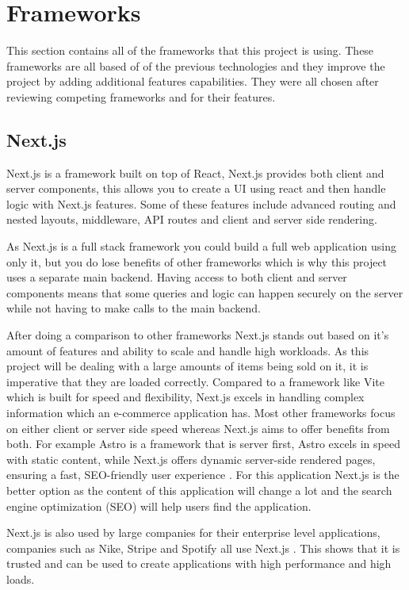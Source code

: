 \documentclass[]{project_report}
\begin{document}
\section{Frameworks}

This section contains all of the frameworks that this project is using. These frameworks are all based of of the previous technologies and they improve the project by adding additional features capabilities. They were all chosen after reviewing competing frameworks and for their features.

\subsection{Next.js}

Next.js is a framework built on top of React, Next.js provides both client and server components, this allows you to create a UI using react and then handle logic with Next.js features. Some of these features include advanced routing and nested layouts, middleware, API routes and client and server side rendering.

As Next.js is a full stack framework you could build a full web application using only it, but you do lose benefits of other frameworks which is why this project uses a separate main backend. Having access to both client and server components means that some queries and logic can happen securely on the server while not having to make calls to the main backend.

After doing a comparison to other frameworks Next.js stands out based on it's amount of features and ability to scale and handle high workloads. As this project will be dealing with a large amounts of items being sold on it, it is imperative that they are loaded correctly. Compared to a framework like Vite which is built for speed and flexibility, Next.js  excels in handling complex information which an e-commerce application has. Most other frameworks focus on either client or server side speed whereas Next.js aims to offer benefits from both. For example Astro is a framework that is server first, Astro excels in speed with static content, while Next.js offers dynamic server-side rendered pages, ensuring a fast, SEO-friendly user experience \cite{astro_nextjs}. For this application Next.js is the better option as the content of this application will change a lot and the search engine optimization (SEO) will help users find the application. 

Next.js is also used by large companies for their enterprise level applications, companies such as Nike, Stripe and Spotify all use Next.js \cite{nextjs_showcase}. This shows that it is trusted and can be used to create applications with high performance and high loads.
\end{document}
